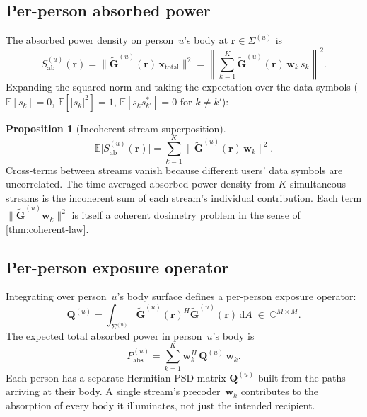 \documentclass[11pt,a4paper]{article}
\theoremstyle{definition}      %
\newtheorem{proposition}[proposition]{Proposition}
\newcommand{\diff}{\mathrm{d}}        %
\begin{document}
\subsection{Per-person absorbed power}\label{sec:mu-per-person}

The absorbed power density on person~$u$'s body at
$\mathbf{r} \in \Sigma^{(u)}$ is
\begin{equation}
  S_\mathrm{ab}^{(u)}(\mathbf{r})
  = \bigl\|\tilde{\mathbf{G}}^{(u)}(\mathbf{r})\,
    \mathbf{x}_\mathrm{total}\bigr\|^2
  = \left\|\sum_{k=1}^K
    \tilde{\mathbf{G}}^{(u)}(\mathbf{r})\,\mathbf{w}_k\,s_k\right\|^2.
\end{equation}
Expanding the squared norm and taking the expectation over the data
symbols ($\mathbb{E}[s_k] = 0$, $\mathbb{E}[|s_k|^2] = 1$,
$\mathbb{E}[s_k s_{k'}^*] = 0$ for $k \neq k'$):

\begin{proposition}[Incoherent stream superposition]\label{prop:mu-superposition}
\begin{equation}\label{eq:Sab-MU-expect}
  \mathbb{E}\bigl[S_\mathrm{ab}^{(u)}(\mathbf{r})\bigr]
  = \sum_{k=1}^K
  \bigl\|\tilde{\mathbf{G}}^{(u)}(\mathbf{r})\,\mathbf{w}_k\bigr\|^2.
\end{equation}
Cross-terms between streams vanish because different users' data
symbols are uncorrelated.  The time-averaged absorbed power density
from $K$ simultaneous streams is the incoherent sum of each stream's
individual contribution.  Each term
$\|\tilde{\mathbf{G}}^{(u)}\mathbf{w}_k\|^2$ is itself a coherent
dosimetry problem in the sense of \cref{thm:coherent-law}.
\end{proposition}

\subsection{Per-person exposure operator}\label{sec:mu-Q}

Integrating over person~$u$'s body surface defines a per-person
exposure operator:
\begin{equation}\label{eq:Q-u}
  \mathbf{Q}^{(u)} = \int_{\Sigma^{(u)}}
  \tilde{\mathbf{G}}^{(u)}(\mathbf{r})^H
  \tilde{\mathbf{G}}^{(u)}(\mathbf{r})\,\diff A
  \;\in\; \mathbb{C}^{M\times M}.
\end{equation}
The expected total absorbed power in person~$u$'s body is
\begin{equation}\label{eq:Pabs-MU}
  \boxed{P_\mathrm{abs}^{(u)}
  = \sum_{k=1}^K \mathbf{w}_k^H\,\mathbf{Q}^{(u)}\,\mathbf{w}_k.}
\end{equation}
Each person has a separate Hermitian PSD matrix $\mathbf{Q}^{(u)}$
built from the paths arriving at their body.  A single stream's
precoder~$\mathbf{w}_k$ contributes to the absorption of every body
it illuminates, not just the intended recipient.
\end{document}
